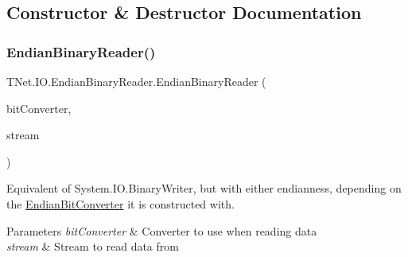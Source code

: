 \subsection{Constructor \& Destructor Documentation}
\mbox{\label{class_t_net_1_1_i_o_1_1_endian_binary_reader_aafe4ad76a51e032b04cf5cb1571d90de}} 
\subsubsection{\texorpdfstring{Endian\+Binary\+Reader()}{EndianBinaryReader()}\hspace{0.1cm}{\footnotesize\ttfamily [1/2]}}
{\footnotesize\ttfamily T\+Net.\+I\+O.\+Endian\+Binary\+Reader.\+Endian\+Binary\+Reader (\begin{DoxyParamCaption}\item[{\mbox{\hyperlink{class_t_net_1_1_i_o_1_1_endian_bit_converter}{Endian\+Bit\+Converter}}}]{bit\+Converter,  }\item[{Stream}]{stream }\end{DoxyParamCaption})}



Equivalent of System.\+I\+O.\+Binary\+Writer, but with either endianness, depending on the \mbox{\hyperlink{class_t_net_1_1_i_o_1_1_endian_bit_converter}{Endian\+Bit\+Converter}} it is constructed with. 


\begin{DoxyParams}{Parameters}
{\em bit\+Converter} & Converter to use when reading data\\
\hline
{\em stream} & Stream to read data from\\
\hline
\end{DoxyParams}
\mbox{\label{class_t_net_1_1_i_o_1_1_endian_binary_reader_acd3b2751b1fe637b86604d533092ecc7}} 

